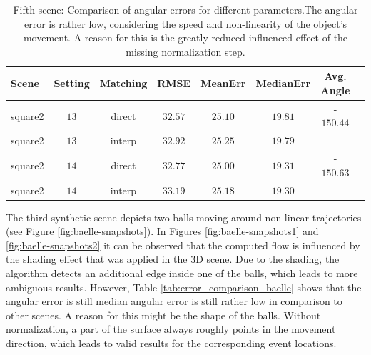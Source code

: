 \begin{table}[tb]
	\centering
		\begin{tabular}{lccccccc}
Scene & Setting & Matching & RMSE & MeanErr & MedianErr & Avg. Angle \\
\hline  \hline
square2 & $13$ & direct & $32.57$ & $25.10$ & $19.81$ & -$150.44$ & \\
square2 & $13$ & interp & $32.92$ & $25.25$ & $19.79$ &  & \\
square2 & $14$ & direct & $32.77$ & $25.00$ & $19.31$ & -$150.63$ & \\
square2 & $14$ & interp & $33.19$ & $25.18$ & $19.30$ &  & \\
		\end{tabular}
	\caption[Fifth scene: Comparison of angular errors for different parameters.]{Fifth scene: Comparison of angular errors for different parameters.The angular error is rather low, considering the speed and non-linearity of the object's movement.
	A reason for this is the greatly reduced influenced effect of the missing normalization step.}
	\label{tab:error_comparison_square2}
\end{table}


The third synthetic scene depicts two balls moving around non-linear trajectories (see Figure \ref{fig:baelle-snapshots}). 
In Figures \ref{fig:baelle-snapshots1} and \ref{fig:baelle-snapshots2} it can be observed that the computed flow is influenced by the shading effect that was applied in the 3D scene. 
Due to the shading, the algorithm detects an additional edge inside one of the balls, which leads to more ambiguous results.
However, Table \ref{tab:error_comparison_baelle} shows that the angular error is still median angular error is still rather low in comparison to other scenes.
A reason for this might be the shape of the balls. 
Without normalization, a part of the surface always roughly points in the movement direction, which leads to valid results for the corresponding event locations.

